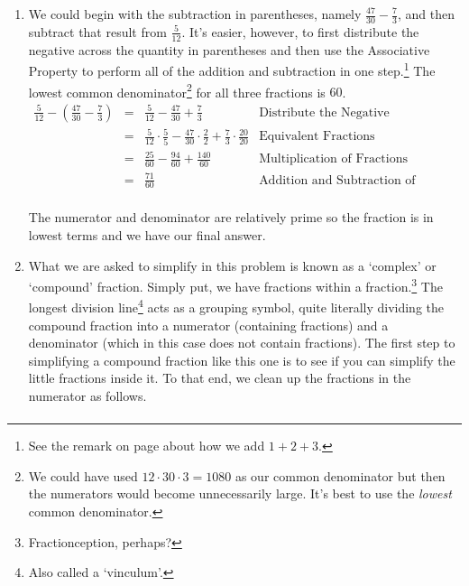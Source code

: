 \documentclass{ximera}
\begin{document}
\begin{example}
\begin{enumerate}
\[\begin{array}{rclr}
\frac{1}{4} + \frac{6}{7} & = & \frac{1}{4} \cdot \frac{7}{7} + \frac{6}{7} \cdot \frac{4}{4} &  \text{Equivalent Fractions} \\  
                                           & = & \frac{7}{28}  + \frac{24}{28} & \text{Multiplication of Fractions}\\  
																					 & = & \frac{31}{28}                  & \text{Addition of Fractions} \\ \end{array} \]

The result is in lowest terms because $31$ and $28$ are relatively prime so we're done.


\item  We could begin with the subtraction in parentheses, namely $\frac{47}{30} - \frac{7}{3}$, and then subtract that result from $\frac{5}{12}$.  It's easier, however, to first distribute the negative across the quantity in parentheses and then use the Associative Property to perform all of the addition and subtraction in one step.\footnote{See the remark on page \pageref{howtoaddonetwothree} about how we add $1 + 2 + 3$.}  The lowest common denominator\footnote{We could have used $12 \cdot 30 \cdot 3 = 1080$ as our common denominator but then the numerators would become unnecessarily large.  It's best to use the \emph{lowest} common denominator.} for all three fractions is $60$.\[ \begin{array}{rclr}

\frac{5}{12} - \left(\frac{47}{30} - \frac{7}{3}\right) & = & \frac{5}{12} - \frac{47}{30} + \frac{7}{3} & \text{Distribute the Negative}\\  
& = & \frac{5}{12} \cdot \frac{5}{5} - \frac{47}{30} \cdot \frac{2}{2} + \frac{7}{3} \cdot \frac{20}{20} & \text{Equivalent Fractions}\\  
& = & \frac{25}{60} - \frac{94}{60} + \frac{140}{60} & \text{Multiplication of Fractions} \\  
& = & \frac{71}{60} & \text{Addition and Subtraction of Fractions} \\ \end{array}\]

The numerator and denominator are relatively prime so the fraction is in lowest terms and we have our final answer.


\item What we are asked to simplify in this problem is known as a  `complex' or `compound' fraction.  Simply put, we have fractions within a fraction.\footnote{Fractionception, perhaps?}  The longest division line\footnote{Also called a `vinculum'.} acts as a grouping symbol, quite literally dividing the compound fraction into a numerator (containing fractions) and a denominator (which in this case does not contain fractions).  The first step to simplifying a compound fraction like this one is to see if you can simplify the little fractions inside it.  To that end, we clean up the fractions in the numerator as follows.\[ \begin{array}{rclr}


\end{array}\]
\end{enumerate}
\end{example}
\end{document}
